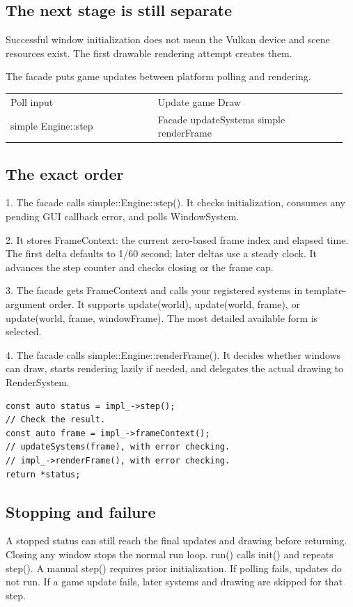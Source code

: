 \documentclass[11pt,a4paper]{article}
\begin{document}
\subsection*{The next stage is still separate}
Successful window initialization does not mean the Vulkan device and scene resources exist. The first drawable rendering attempt creates them.

\label{core-28}
The facade puts game updates between platform polling and rendering.

{\small
\begin{longtable}{@{}p{0.42\linewidth}p{0.54\linewidth}@{}}
Poll input & Update game                                Draw \\
simple Engine::step & Facade updateSystems                    simple renderFrame \\
\end{longtable}
}

\subsection*{The exact order}
1. The facade calls simple::Engine::step(). It checks initialization, consumes any pending GUI callback error, and polls WindowSystem.

2. It stores FrameContext: the current zero-based frame index and elapsed time. The first delta defaults to 1/60 second; later deltas use a steady clock. It advances the step counter and checks closing or the frame cap.

3. The facade gets FrameContext and calls your registered systems in template-argument order. It supports update(world), update(world, frame), or update(world, frame, windowFrame). The most detailed available form is selected.

4. The facade calls simple::Engine::renderFrame(). It decides whether windows can draw, starts rendering lazily if needed, and delegates the actual drawing to RenderSystem.

\begin{lstlisting}[language={}]
const auto status = impl_->step();
// Check the result.
const auto frame = impl_->frameContext();
// updateSystems(frame), with error checking.
// impl_->renderFrame(), with error checking.
return *status;
\end{lstlisting}

\subsection*{Stopping and failure}
A stopped status can still reach the final updates and drawing before returning. Closing any window stops the normal run loop. run() calls init() and repeats step(). A manual step() requires prior initialization. If polling fails, updates do not run. If a game update fails, later systems and drawing are skipped for that step.
\end{document}
